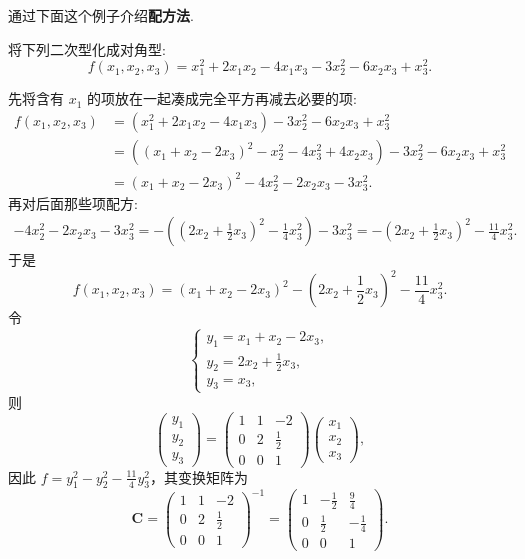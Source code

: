 \documentclass[../../main.tex]{subfiles}%
\begin{document}
通过下面这个例子介绍\textbf{配方法}.
\begin{example}\label{example:二次型化简配方法例题1}
将下列二次型化成对角型:
\[
f(x_1,x_2,x_3)=x_1^2 + 2x_1x_2 - 4x_1x_3 - 3x_2^2 - 6x_2x_3 + x_3^2.
\]
\end{example}
\begin{solution}

先将含有 $x_1$ 的项放在一起凑成完全平方再减去必要的项:
\begin{align*}
f(x_1,x_2,x_3)&=(x_1^2 + 2x_1x_2 - 4x_1x_3) - 3x_2^2 - 6x_2x_3 + x_3^2\\
&=((x_1 + x_2 - 2x_3)^2 - x_2^2 - 4x_3^2 + 4x_2x_3) - 3x_2^2 - 6x_2x_3 + x_3^2\\
&=(x_1 + x_2 - 2x_3)^2 - 4x_2^2 - 2x_2x_3 - 3x_3^2.
\end{align*}
再对后面那些项配方:
\begin{align*}
-4x_2^2 - 2x_2x_3 - 3x_3^2=-\left((2x_2 + \frac{1}{2}x_3)^2 - \frac{1}{4}x_3^2\right) - 3x_3^2
=-(2x_2 + \frac{1}{2}x_3)^2 - \frac{11}{4}x_3^2.
\end{align*}
于是
\[
f(x_1,x_2,x_3)=(x_1 + x_2 - 2x_3)^2 - (2x_2 + \frac{1}{2}x_3)^2 - \frac{11}{4}x_3^2.
\]
令
\[
\begin{cases}
y_1 = x_1 + x_2 - 2x_3,\\
y_2 = 2x_2 + \frac{1}{2}x_3,\\
y_3 = x_3,
\end{cases}
\]
则
\[
\begin{pmatrix}
y_1\\
y_2\\
y_3
\end{pmatrix}=
\begin{pmatrix}
1 & 1 & -2\\
0 & 2 & \frac{1}{2}\\
0 & 0 & 1
\end{pmatrix}
\begin{pmatrix}
x_1\\
x_2\\
x_3
\end{pmatrix},
\]
因此 $f = y_1^2 - y_2^2 - \frac{11}{4}y_3^2$，其变换矩阵为
\[
\boldsymbol{C}=
\begin{pmatrix}
1 & 1 & -2\\
0 & 2 & \frac{1}{2}\\
0 & 0 & 1
\end{pmatrix}^{-1}=
\begin{pmatrix}
1 & -\frac{1}{2} & \frac{9}{4}\\
0 & \frac{1}{2} & -\frac{1}{4}\\
0 & 0 & 1
\end{pmatrix}.
\]

\end{solution}
\end{document}
